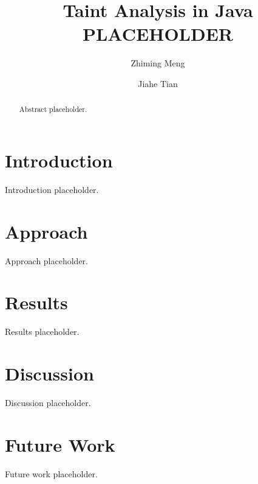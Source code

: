 \documentclass[acmsmall]{acmart}
\begin{document}
\title{Taint Analysis in Java PLACEHOLDER}

\author{Zhiming Meng}

\author{Jiahe Tian}

\begin{abstract}
    Abstract placeholder.
\end{abstract}

\maketitle

\section{Introduction}
Introduction placeholder.

\section{Approach}
Approach placeholder.

\section{Results}
Results placeholder.

\section{Discussion}
Discussion placeholder.

\section{Future Work}
Future work placeholder.~\cite{Test_Bib}



\end{document}
